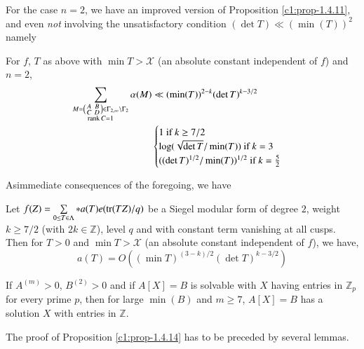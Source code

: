 For the case $n=2$, we have an improved version of Proposition
\ref{c1:prop-1.4.11}, and even {\em not} involving the unsatisfactory
condition $(\det T)\ll (\min (T))^{2}$ namely 

\setcounter{subprop}{13}
\begin{subprop}\label{c1:prop-1.4.14}
For $f$, $T$ as above with $\min T>\mathscr{X}$ (an absolute constant
independent of $f$) and $n=2$,
\begin{align*}
\sum_{\substack{M=\left(\begin{smallmatrix} A & B\\ C & D
    \end{smallmatrix}
\right)\in\Gamma_{2,\infty}\backslash \Gamma_{2}\\ \operatorname{rank}
C=1}}\alpha(M) &\ll (\min(T))^{2-k}(\det T)^{k-3/2}\\
&
\begin{cases}
1 \text{ if } k\geq 7/2\\
\log (\sqrt{\det T}/\min (T))\text{ if } k=3\\
((\det T)^{1/2}/\min (T))^{1/2}\text{ if } k=\frac{5}{2}
\end{cases}
\end{align*}
\end{subprop}

As\pageoriginale immediate consequences of the foregoing, we have

\setcounter{subtheorem}{14}
\begin{subtheorem}\label{c1:thm-1.4.15}
Let $f(Z)=\sum\limits_{0\leq T\in\Lambda}\ast a(T)e(\operatorname{tr}(TZ)/q)$ be a
Siegel modular form of degree $2$, weight $k\geq 7/2$ (with $2k\in
\mathbb{Z}$), level $q$ and with constant term vanishing at all
cusps. Then for $T>0$ and $\min T>\mathscr{X}$ (an absolute constant
independent of $f$), we have,
$$
a(T)=O((\min T)^{(3-k)/2}(\det T)^{k-3/2})
$$
\end{subtheorem}

\begin{coro*}
If $A^{(m)}>0$, $B^{(2)}>0$ and if $A[X]=B$ is solvable with $X$
having entries in $\mathbb{Z}_{p}$ for every prime $p$, then for large
$\min (B)$ and $m\geq 7$, $A[X]=B$ has a solution $X$ with entries in
$\mathbb{Z}$. 
\end{coro*}

The proof of Proposition \ref{c1:prop-1.4.14} has to be preceded by
several lemmas.

